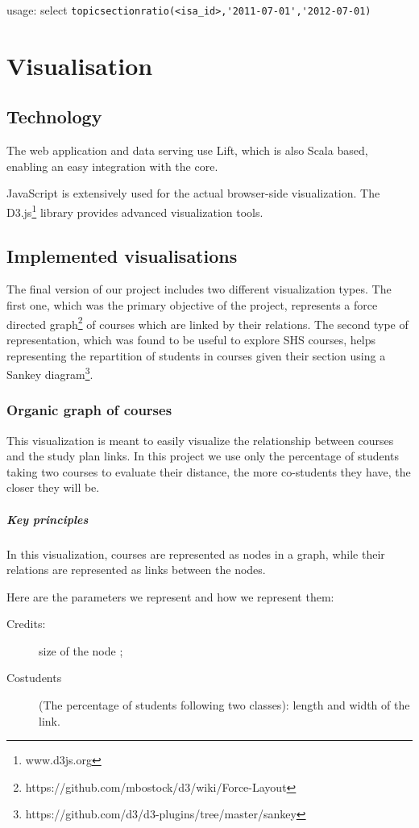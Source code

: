 usage: select \verb|topicsectionratio(<isa_id>,'2011-07-01','2012-07-01)|

\chapter{Visualisation}

\section{Technology}
The web application and data serving use Lift, which is also Scala based, enabling an easy integration with the core.

JavaScript is extensively used for the actual browser-side visualization. The D3.js\footnote{www.d3js.org} library provides advanced visualization tools. 

\section{Implemented visualisations}
The final version of our project includes two different visualization types. The first one, which was the primary objective of the project, represents a force directed graph\footnote{https://github.com/mbostock/d3/wiki/Force-Layout} of courses which are linked by their relations. The second type of representation, which was found to be useful to explore SHS courses, helps representing the repartition of students in courses given their section using a Sankey diagram\footnote{https://github.com/d3/d3-plugins/tree/master/sankey}. 

\subsection{Organic graph of courses}
This visualization is meant to easily visualize the relationship between courses and the study plan links. In this project we use only the percentage of students taking two courses to evaluate their distance, the more co-students they have, the closer they will be.  

\paragraph{Key principles}
In this visualization, courses are represented as nodes in a graph, while their relations are represented as links between the nodes. 

Here are the parameters we represent and how we represent them: 
\begin{description}
\item[Credits:] size of the node ;
\item[Costudents] (The percentage of students following two classes): length and width of the link.
\end{description}

